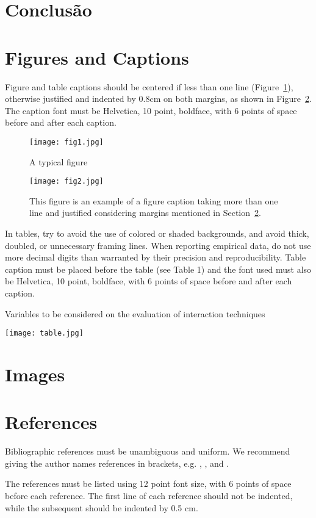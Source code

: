 \documentclass[12pt]{article}
\begin{document}
\section{Conclusão}


\section{Figures and Captions}\label{sec:figs}


Figure and table captions should be centered if less than one line
(Figure~\ref{fig:exampleFig1}), otherwise justified and indented by 0.8cm on
both margins, as shown in Figure~\ref{fig:exampleFig2}. The caption font must
be Helvetica, 10 point, boldface, with 6 points of space before and after each
caption.

\begin{figure}[ht]
\centering
\texttt{[image: fig1.jpg]}
\caption{A typical figure}
\label{fig:exampleFig1}
\end{figure}

\begin{figure}[ht]
\centering
\texttt{[image: fig2.jpg]}
\caption{This figure is an example of a figure caption taking more than one
  line and justified considering margins mentioned in Section~\ref{sec:figs}.}
\label{fig:exampleFig2}
\end{figure}

In tables, try to avoid the use of colored or shaded backgrounds, and avoid
thick, doubled, or unnecessary framing lines. When reporting empirical data,
do not use more decimal digits than warranted by their precision and
reproducibility. Table caption must be placed before the table (see Table 1)
and the font used must also be Helvetica, 10 point, boldface, with 6 points of
space before and after each caption.

\begin{table}[ht]
\centering
\caption{Variables to be considered on the evaluation of interaction
  techniques}
\label{tab:exTable1}
\texttt{[image: table.jpg]}
\end{table}

\section{Images}

\section{References}

Bibliographic references must be unambiguous and uniform.  We recommend giving
the author names references in brackets, e.g. \cite{knuth:84},
\cite{boulic:91}, and \cite{smith:99}.

The references must be listed using 12 point font size, with 6 points of space
before each reference. The first line of each reference should not be
indented, while the subsequent should be indented by 0.5 cm.



\end{document}
